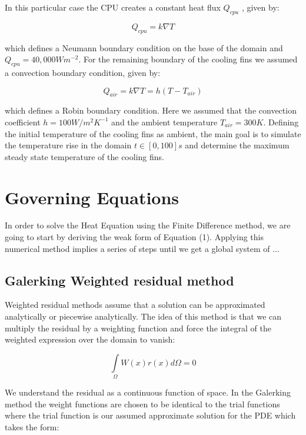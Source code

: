 \documentclass[12pt]{article}
\begin{document}
In this particular case the CPU creates a constant heat flux $Q_{cpu}$ , given by:

	\begin{equation}
		Q_{cpu} = k \nabla T
	\end{equation}
	
which defines a Neumann boundary condition on the base of the domain and $Q_{cpu} = 40,000Wm^{-2}$. For the remaining boundary of the cooling fins we assumed a convection boundary condition, given by:

	\begin{equation}
		Q_{air} = k \nabla T = h(T-T_{air})
	\end{equation}

which defines a Robin boundary condition. Here we assumed that the convection coefficient $h = 100W/m^2K^{-1}$ and the ambient temperature $T_{air} = 300K$. Defining the initial temperature of the cooling fins as ambient, the main goal is  to simulate the temperature rise in the domain $t \in [0,100]s$ and determine the maximum steady state temperature of the cooling fins.
	

	
	\section{Governing Equations}

In order to solve the Heat Equation using the Finite Difference method, we are going to start by deriving the weak form of Equation (1). Applying this numerical method implies a series of steps until we get a global system of ...

\subsection{Galerking Weighted residual method}
Weighted residual methods assume that a solution can be approximated analytically or piecewise analytically. The idea of this method is that we can multiply the residual by a weighting function and force the integral of the weighted expression over the domain to vanish:

	\begin{equation}
		\int\limits_{\Omega} W(x) r(x) d\Omega = 0
	\end{equation}
	
	We understand the residual as a continuous function of space.  In the Galerking method the weight functions are chosen to be identical to the trial functions where the trial function is our assumed approximate solution for the PDE which takes the form:
	
\end{document}
